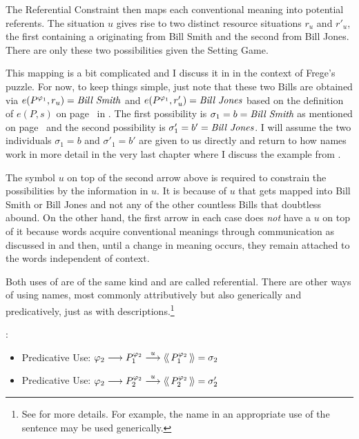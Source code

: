 The Referential Constraint then maps each conventional meaning into potential referents. The situation $u$ gives rise to two distinct resource situations $r_u$ and $r'_u$, the first containing a  originating from Bill Smith and the second from Bill Jones. There are only these two possibilities given the Setting Game. 

This mapping is a bit complicated and I discuss it in  in the context of Frege's puzzle. For now, to keep things simple, just note that these two Bills are obtained via $e(P^{\varphi_1}, r_u) = \hbox{\emph{Bill Smith}}$ and $e(P^{\varphi_1}, r'_u) = \hbox{\emph{Bill Jones}}$ based on the definition of $e(P, s)$ on page~\pageref{page:e(P,s)} in . The first possibility is $\sigma_1 = b = \emph{Bill Smith}$ as mentioned on page~\pageref{page:Bill} and the second possibility is $\sigma'_1 = b' = \emph{Bill Jones}$. I will assume the two individuals $\sigma_1 = b$ and $\sigma'_1 = b'$ are given to us directly and return to how names work in more detail in the very last chapter where I discuss the  example from . 

The symbol $u$ on top of the second arrow above is required to constrain the possibilities by the information in $u$. It is because of $u$ that  gets mapped into Bill Smith or Bill Jones and not any of the other countless Bills that doubtless abound. On the other hand, the first arrow in each case does \emph{not} have a $u$ on top of it because words acquire conventional meanings through communication as discussed in  and then, until a change in meaning occurs, they remain attached to the words independent of context.

Both uses of  are of the same kind and are called referential. There are other ways of using names, most commonly attributively but also generically and predicatively, just as with descriptions.\footnote{See \citet[Chapter~6]{parikh:le} for more details. For example, the name  in an appropriate use of the sentence  may be used generically.}

\noindent\parbox{\textwidth}{\ea {}:\\
\begin{itemize}
\item Predicative Use: $\varphi_2 \longrightarrow P^{\varphi_2}_1 \stackrel{u}\longrightarrow \langle\!\langle\,P^{\varphi_2}_1\,\rangle\!\rangle = \sigma_2$
\item Predicative Use: $\varphi_2 \longrightarrow P^{\varphi_2}_2 \stackrel{u}\longrightarrow \langle\!\langle\,P^{\varphi_2}_2\,\rangle\!\rangle = \sigma'_2$
\end{itemize}
\z}


